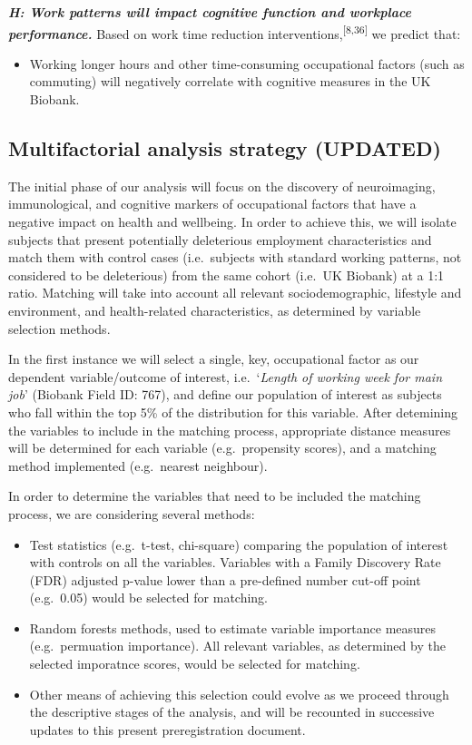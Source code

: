 \documentclass[
  english,
  man, donotrepeattitle]{apa6}
\providecommand{\tightlist}{%
  \setlength{\itemsep}{0pt}\setlength{\parskip}{0pt}}
\begin{document}
\textbf{\emph{H: Work patterns will impact cognitive function and workplace performance.}} Based on work time reduction interventions,\textsuperscript{{[}8,36{]}} we predict that:

\begin{itemize}
\tightlist
\item
  Working longer hours and other time-consuming occupational factors (such as commuting) will negatively correlate with cognitive measures in the UK Biobank.
\end{itemize}

\newpage

\hypertarget{multifactorial-analysis-strategy-updated}{%
\subsection{Multifactorial analysis strategy (UPDATED)}\label{multifactorial-analysis-strategy-updated}}

The initial phase of our analysis will focus on the discovery of neuroimaging, immunological, and cognitive markers of occupational factors that have a negative impact on health and wellbeing. In order to achieve this, we will isolate subjects that present potentially deleterious employment characteristics and match them with control cases (i.e.~subjects with standard working patterns, not considered to be deleterious) from the same cohort (i.e.~UK Biobank) at a 1:1 ratio. Matching will take into account all relevant sociodemographic, lifestyle and environment, and health-related characteristics, as determined by variable selection methods.

In the first instance we will select a single, key, occupational factor as our dependent variable/outcome of interest, i.e.~`\emph{Length of working week for main job}' (Biobank Field ID: 767), and define our population of interest as subjects who fall within the top 5\% of the distribution for this variable. After detemining the variables to include in the matching process, appropriate distance measures will be determined for each variable (e.g.~propensity scores), and a matching method implemented (e.g.~nearest neighbour).

In order to determine the variables that need to be included the matching process, we are considering several methods:

\begin{itemize}
\item
  Test statistics (e.g.~t-test, chi-square) comparing the population of interest with controls on all the variables. Variables with a Family Discovery Rate (FDR) adjusted p-value lower than a pre-defined number cut-off point (e.g.~0.05) would be selected for matching.
\item
  Random forests methods, used to estimate variable importance measures (e.g.~permuation importance). All relevant variables, as determined by the selected imporatnce scores, would be selected for matching.
\item
  Other means of achieving this selection could evolve as we proceed through the descriptive stages of the analysis, and will be recounted in successive updates to this present preregistration document.
\end{itemize}
\end{document}
